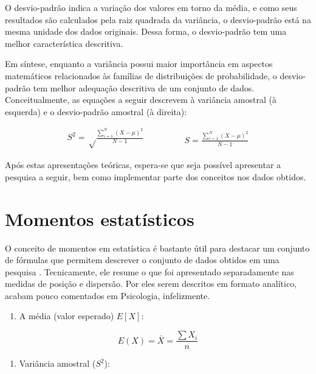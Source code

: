 \documentclass[
]{book}
\providecommand{\tightlist}{%
  \setlength{\itemsep}{0pt}\setlength{\parskip}{0pt}}
\begin{document}
O desvio-padrão indica a variação dos valores em torno da média, e como seus resultados são calculados pela raiz quadrada da variância, o desvio-padrão está na mesma unidade dos dados originais. Dessa forma, o desvio-padrão tem uma melhor característica descritiva.

Em síntese, enquanto a variância possui maior importância em aspectos matemáticos relacionados às famílias de distribuições de probabilidade, o desvio-padrão tem melhor adequação descritiva de um conjunto de dados. Conceitualmente, as equações a seguir descrevem à variância amostral (à esquerda) e o desvio-padrão amostral (à direita):

\begin{equation}
  \begin{split}
    S^2 = \sqrt\frac{\sum\limits_{i=1}^N (X -\mu)^2}{N-1}
  \end{split}
\qquad\qquad
  \begin{split}
    S = \frac{\sum\limits_{i=1}^N (X -\mu)^2}{N-1}
  \end{split}
\end{equation}

Após estas apresentações teóricas, espera-se que seja possível apresentar a pesquisa a seguir, bem como implementar parte dos conceitos nos dados obtidos.

\hypertarget{momentos-estatuxedsticos}{%
\section{Momentos estatísticos}\label{momentos-estatuxedsticos}}

O conceito de momentos em estatística é bastante útil para destacar um conjunto de fórmulas que permitem descrever o conjunto de dados obtidos em uma pesquisa \citep{JenkinsSmith2017}. Tecnicamente, ele resume o que foi apresentado separadamente nas medidas de posição e dispersão. Por eles serem descritos em formato analítico, acabam pouco comentados em Psicologia, infelizmente.

\begin{enumerate}
\def\labelenumi{\arabic{enumi}.}
\tightlist
\item
  A média (valor esperado) \(E[X]\):
\end{enumerate}

\[E(X) = \bar{X}=\frac{\sum X_{i}}{n}\]

\begin{enumerate}
\def\labelenumi{\arabic{enumi}.}
\setcounter{enumi}{1}
\tightlist
\item
  Variância amostral (\(S^2\)):
\end{enumerate}
\end{document}
